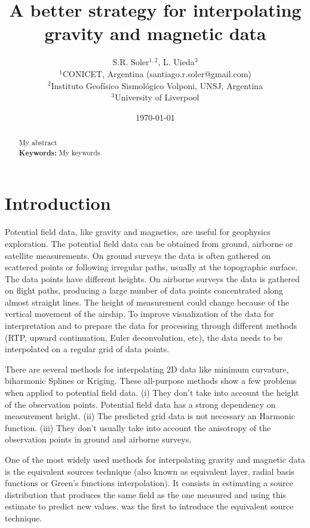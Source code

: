 \documentclass[twocolumn]{article}
\makeatletter
\newcommand{\Title}{
    A better strategy for interpolating gravity and magnetic data
}
\newcommand{\AuthorAffil}{
    {\large
        S.R. Soler$^{1,2}$,
        L. Uieda$^{3}$
    }
    \\[0.4cm]
    {\small $^{1}$CONICET, Argentina (santiago.r.soler@gmail.com)} \\
    {\small $^{2}$Instituto Geofísico Sismológico Volponi, UNSJ, Argentina} \\
    {\small $^{3}$University of Liverpool} \\

}
\makeatother
\begin{document}
\title{\Title}
\author{\AuthorAffil}
\date{
    \normalsize
    \today
}
\maketitle

\begin{abstract}
    My abstract
    \\[0.5cm]
    \textbf{Keywords:}
    My keywords
\end{abstract}


\section{Introduction}

Potential field data, like gravity and magnetics, are useful for geophysics
exploration.
The potential field data can be obtained from ground, airborne or satellite
measurements.
On ground surveys the data is often gathered on scattered points or following
irregular paths, usually at the topographic surface.
The data points have different heights.
On airborne surveys the data is gathered on flight paths, producing a large
number of data points concentrated along almost straight lines.
The height of measurement could change because of the vertical movement of the
airship.
To improve visualization of the data for interpretation and to prepare the data
for processing through different methods (RTP, upward continuation, Euler
deconvolution, etc), the data needs to be interpolated on a regular grid of
data points.

There are several methods for interpolating 2D data like minimum curvature,
biharmonic Splines or Kriging.
These all-purpose methods show a few problems when applied to potential field
data.
(i) They don't take into account the height of the observation points.
Potential field data has a strong dependency on measurement height.
(ii) The predicted grid data is not necessary an Harmonic function.
(iii) They don't usually take into account the anisotropy of the observation
points in ground and airborne surveys.

One of the most widely used methods for interpolating gravity and magnetic data
is the equivalent sources technique (also known as equivalent layer, radial
basis functions or Green's functions interpolation).
It consists in estimating a source distribution that produces the same field as
the one measured and using this estimate to predict new values.
\citet{dampney1969} was the first to introduce the equivalent source technique.
\end{document}
